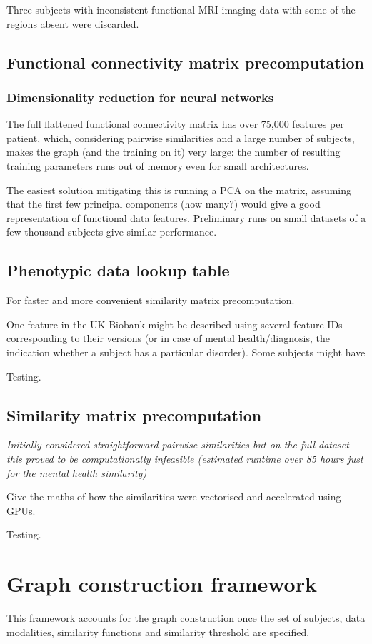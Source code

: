 Three subjects with inconsistent functional MRI imaging data with some of the regions absent were discarded.


\subsection{Functional connectivity matrix precomputation}

\subsubsection{Dimensionality reduction for neural networks}
The full flattened functional connectivity matrix has over 75,000 features per patient, which, considering pairwise similarities and a large number of subjects, makes the graph (and the training on it) very large: the number of resulting training parameters runs out of memory even for small architectures.

The easiest solution mitigating this is running a PCA on the matrix, assuming that the first few principal components (how many?) would give a good representation of functional data features. Preliminary runs on small datasets of a few thousand subjects give similar performance.

\subsection{Phenotypic data lookup table}
For faster and more convenient similarity matrix precomputation.

One feature in the UK Biobank might be described using several feature IDs corresponding to their versions (or in case of mental health/diagnosis, the indication whether a subject has a particular disorder). Some subjects might have 

Testing.

\subsection{Similarity matrix precomputation}
\textit{Initially considered straightforward pairwise similarities but on the full dataset this proved to be computationally infeasible (estimated runtime over 85 hours just for the mental health similarity)}

Give the maths of how the similarities were vectorised and accelerated using GPUs.

Testing.

\section{Graph construction framework}
This framework accounts for the graph construction once the set of subjects, data modalities, similarity functions and similarity threshold are specified.


